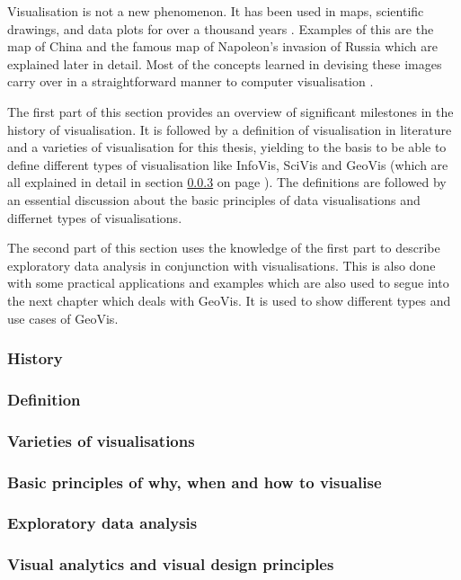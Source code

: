 Visualisation is not a new phenomenon. It has been used in maps, scientific drawings, and data plots for over a thousand years . Examples of this are the map of China and the famous map of Napoleon's invasion of Russia which are explained later in detail. Most of the concepts learned in devising these images carry over in a straightforward manner to computer visualisation .

The first part of this section provides an overview of significant milestones in the history of visualisation. It is followed by a definition of visualisation in literature and a varieties of visualisation for this thesis, yielding to the basis to be able to define different types of visualisation like \ac{InfoVis}, \ac{SciVis} and \ac{GeoVis} (which are all explained in detail in section \ref{s:definitions-types} on page \pageref{s:definitions-types}). The definitions are followed by an essential discussion about the basic principles of data visualisations and differnet types of visualisations.

The second part of this section uses the knowledge of the first part to describe exploratory data analysis in conjunction with visualisations. This is also done with some practical applications and examples which are also used to segue into the next chapter which deals with \ac{GeoVis}. It is used to show different types and use cases of \ac{GeoVis}.

\subsubsection{History}
\label{s:history}


\subsubsection{Definition}
\label{s:definition}


\subsubsection{Varieties of visualisations}
\label{s:definitions-types}


\subsubsection{Basic principles of why, when and how to visualise}
\label{s:basics}


\subsubsection{Exploratory data analysis}
\label{s:eda}


\subsubsection{Visual analytics and visual design principles}
\label{s:va}

